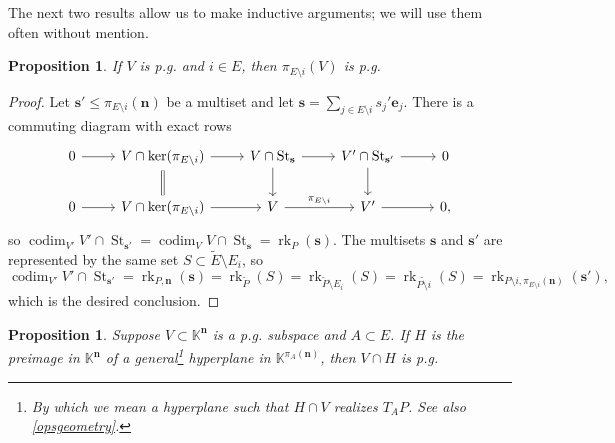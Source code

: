 \documentclass[11pt]{article}
\newtheorem{prop}[theo]{Proposition}
\theoremstyle{definition}
\numberwithin{equation}{section}
\DeclareMathOperator{\St}{St}
\newcommand{\K}{\mathbb{K}}
\DeclareMathOperator{\rk}{rk}
\DeclareMathOperator{\codim}{codim}
\begin{document}
The next two results allow us to make inductive arguments; we will use them often without mention.
\begin{prop}
  If $V$ is p.g. and $i \in E$, then $\pi_{E \setminus i}(V)$ is p.g.
\end{prop}
\begin{proof}
  Let $\mathbf s' \leq \pi_{E \setminus i}(\mathbf n)$ be a multiset and let
  $\mathbf s = \sum_{j \in E \setminus i} s_j' \mathbf e_j$.
   There is a commuting diagram with exact rows
  \[\begin{tikzcd}
      0 \ar[r] & V \cap \ker(\pi_{E \setminus i}) \ar[r]\ar[d,equal] & V \cap \St_{\mathbf s} \ar[r] \ar[d] & V' \cap \St_{\mathbf s'} \ar[r]\ar[d] &  0 \\
      0 \ar[r] & V \cap \ker(\pi_{E \setminus i}) \ar[r] & V \ar[r, "\pi_{E \setminus i}"] & V' \ar[r] & 0,
  \end{tikzcd}\]
so $\codim_{V'} V' \cap \St_{\mathbf s'} = \codim_V V \cap \St_{\mathbf s} = \rk_P(\mathbf s)$.
The multisets $\mathbf s$ and $\mathbf s'$ are represented by the same set $S \subset \widetilde E \setminus E_i$, so
\[ \codim_{V'} V' \cap \St_{\mathbf s'} = \rk_{P,\mathbf n}(\mathbf s) =\rk_{\widetilde P}(S) = \rk_{\widetilde P \setminus E_i}(S) = \rk_{\widetilde{P \setminus i}}(S) = \rk_{P\setminus i, \pi_{E \setminus i}(\mathbf n)}(\mathbf s'), \]
which is the desired conclusion.
\end{proof}
\begin{prop}\label{pgtruncation}
  Suppose $V \subset \K^{\mathbf n}$ is a p.g. subspace and $A \subset E$.
  If $H$ is the preimage in $\K^{\mathbf n}$ of a general\footnote{By which we mean a hyperplane such that $H \cap V$ realizes $T_A P$. See also \cref{opsgeometry}.}
  hyperplane in $\K^{\pi_A(\mathbf n)}$, then $V \cap H$ is p.g.
\end{prop}
\end{document}
